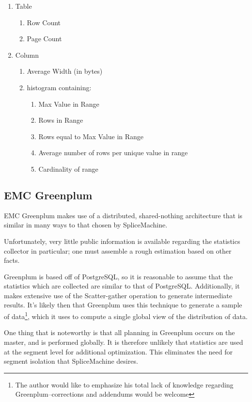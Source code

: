 \begin{enumerate}
	\item Table
					\begin{enumerate}
									\item Row Count
									\item Page Count
					\end{enumerate}
	\item Column
					\begin{enumerate}
									\item Average Width (in bytes)
									\item histogram containing:
													\begin{enumerate}
																	\item Max Value in Range
																	\item Rows in Range
																	\item Rows equal to Max Value in Range
																	\item Average number of rows per unique value in range
																	\item Cardinality of range
													\end{enumerate}
					\end{enumerate}
\end{enumerate}

\subsection{EMC Greenplum}
EMC Greenplum makes use of a distributed, shared-nothing architecture that is similar in many ways to that chosen by SpliceMachine.

Unfortunately, very little public information is available regarding the statistics collector in particular; one must assemble a rough estimation based on other facts.

Greenplum is based off of PostgreSQL, so it is reasonable to assume that the statistics which are collected are similar to that of PostgreSQL. Additionally, it makes extensive use of the Scatter-gather operation to generate intermediate results\cite{GreenplumAdmin}. It's likely then that Greenplum uses this technique to generate a sample of data\footnote{The author would like to emphasize his total lack of knowledge regarding Greenplum--corrections and addendums would be welcome}, which it uses to compute a single global view of the distribution of data.

One thing that is noteworthy is that all planning in Greenplum occurs on the master, and is performed globally\cite{GreenplumAdmin}. It is therefore unlikely that statistics are used at the segment level for additional optimization. This eliminates the need for segment isolation that SpliceMachine desires.

